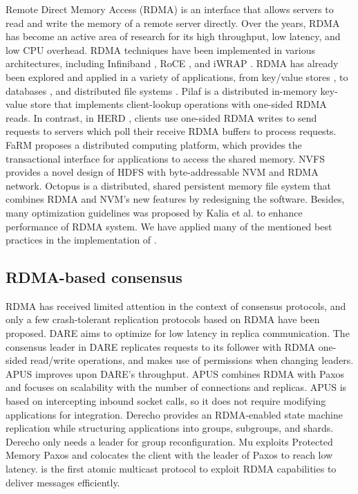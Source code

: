 Remote Direct Memory Access (RDMA) \cite{kalia2016design} is an interface that
allows servers to read and write the memory of a remote server directly. Over
the years, RDMA has become an active area of research for its high throughput,
low latency, and low CPU overhead. RDMA techniques have been implemented in
various architectures, including Infiniband \cite{pfister2001introduction}, RoCE
\cite{beck2011performance}, and iWRAP \cite{rashti200710}. RDMA has already been
explored and applied in a variety of applications, from key/value stores
\cite{FaRM, kalia2014using, mitchell2013using, wei2015fast}, to databases
\cite{binnig2015end, huang2019rdma}, and distributed file systems
\cite{islam2012high, li2009early, wu2003pvfs}. Pilaf \cite{mitchell2013using} is
a distributed in-memory key-value store that implements client-lookup operations
with one-sided RDMA reads. In contrast, in HERD \cite{kalia2014using}, clients use
one-sided RDMA writes to send requests to servers which poll their receive RDMA
buffers to process requests. FaRM \cite{FaRM} proposes a distributed computing
platform, which provides the transactional interface for applications to access
the shared memory. NVFS \cite{islam2012high} provides a novel design of HDFS
with byte-addressable NVM and RDMA network. Octopus \cite{lu2017octopus} is a
distributed, shared persistent memory file system that combines RDMA and NVM's
new features by redesigning the software. Besides, many optimization guidelines
was proposed by Kalia et al. \cite{kalia2016design} to enhance performance of
RDMA system. 
We have applied many of the mentioned best practices
in the implementation of \libname.


\subsection{RDMA-based consensus}
\label{sec:rwrdmacons}

RDMA has received limited attention in the context of consensus
protocols, and only a few crash-tolerant replication protocols based on RDMA 
have been proposed. DARE \cite{DARE} aims to optimize for low latency in replica
communication. The consensus leader in DARE replicates requests to its follower
with RDMA one-sided read/write operations, and makes use of permissions when
changing leaders. APUS \cite{APUS} improves upon DARE's throughput. APUS
combines RDMA with Paxos and focuses on scalability with the number of
connections and replicas. APUS is based on intercepting inbound socket calls, so
it does not require modifying applications for integration. Derecho
\cite{jha2019derecho} provides an RDMA-enabled state machine replication while
structuring applications into groups, subgroups, and shards. Derecho only needs
a leader for group reconfiguration. 
Mu \cite{Mu} exploits Protected Memory Paxos and colocates the client with the leader of Paxos to reach low latency.
\libname is the first atomic multicast protocol to exploit RDMA capabilities to deliver messages efficiently.


